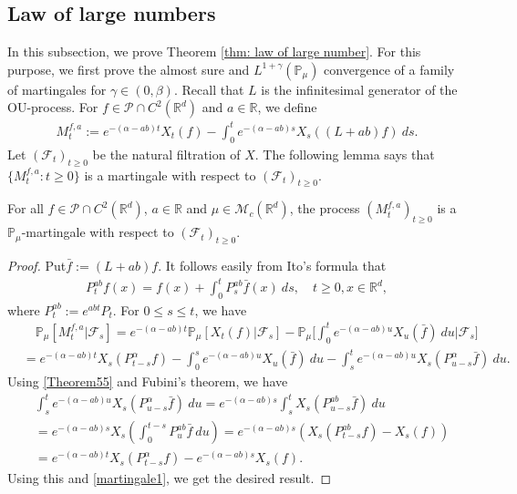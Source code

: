 \documentclass[EJP]{ejpecp} %
\begin{document}
\subsection{Law of large numbers}
\label{sec: large rate lln}

In this subsection, we prove Theorem \ref{thm: law of large number}.
For this purpose, we first prove the almost sure and $L^{1+\gamma}(\mathbb{P}_{\mu})$ convergence of a family of martingales for $\gamma\in (0, \beta)$. Recall that $L$ is the infinitesimal generator of the OU-process.  For $f\in \mathcal{P}\cap C^2(\mathbb R^d)$ and  $a\in \mathbb R$, we define
\begin{align}
  \label{defmartingale}
  M_t^{f,a}
   :=e^{-(\alpha-ab)t}X_t(f)-\int_0^t e^{-(\alpha-ab)s} X_s((L+ab)f)~ ds.
\end{align}
Let $(\mathscr{F}_t)_{t\geq 0}$ be the natural filtration of $X$.  The following lemma says that $\{M_t^{f,a}: t\geq 0\}$ is a martingale with respect to $(\mathscr{F}_t)_{t\geq 0}$.

\begin{lemma}
  \label{lemma25}
  For all $f\in \mathcal{P}\cap C^2(\mathbb R^d)$, $a\in \mathbb R$ and $\mu\in \mathcal M_c(\mathbb R^d)$, the process $(M_t^{f,a})_{t\geq 0}$ is a $\mathbb P_\mu$-martingale with respect to $(\mathscr F_t)_{t\geq 0}$.
\end{lemma}

\begin{proof}
  Put$\bar{f} :=(L+ab)f$.
  It follows easily from Ito's formula that
  \begin{align}
    \label{Theorem55}
    P_t^{ab}f(x)
    = f(x)+\int_0^t P_s^{ab}\bar{f}(x)~ds,\quad t\geq 0,x\in \mathbb R^d,
  \end{align}
  where $P_t^{ab} := e^{abt}P_t$.
  For $0\leq s\leq t$, we have
  \begin{align}
    \label{martingale1}
    & \quad\mathbb{P}_{\mu}[M_t^{f,a}|\mathscr{F}_s]
    =e^{-(\alpha-ab)t}\mathbb{P}_{\mu}\left[X_t(f)|\mathscr{F}_s\right]-\mathbb{P}_{\mu}\Big[\int_0^t e^{-(\alpha-ab)u}X_u(\bar{f})~ du\Big|\mathscr{F}_s\big] \\
    & =e^{-(\alpha-ab)t} X_s(P_{t-s}^{\alpha}f)-\int_0^s e^{-(\alpha-ab)u} X_u(\bar{f})~ du - \int_s^t e^{-(\alpha-ab)u}X_s(P_{u-s}^{\alpha} \bar{f})~ du.
  \end{align}
  Using \eqref{Theorem55} and Fubini's theorem, we have
  \begin{align}
    & \int_s^t e^{-(\alpha-ab)u}X_s(P_{u-s}^{\alpha} \bar{f})~ du=e^{-(\alpha-ab)s}\int_s^tX_s(P_{u-s}^{ab}\bar{f})~du\\
    & = e^{ - ( \alpha - ab ) s } X_s\left( \int_0^{t-s} P_{u}^{ab} \bar{f}~ du\right)
      = e^{-(\alpha-ab)s}\left(X_s(P_{t-s}^{ab}f) - X_s(f) \right) \\
    & = e^{-(\alpha-ab)t} X_s( P_{t-s}^{\alpha}f) - e^{ - ( \alpha - ab ) s} X_s(f).
  \end{align}
  Using this and \eqref{martingale1}, we get the desired result.
\end{proof}
\end{document}
